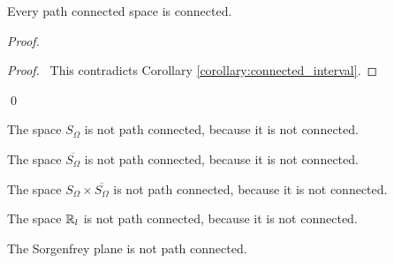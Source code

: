 \begin{proposition}
    \label{proposition:connected_path_connected}
    Every path connected space is connected.
\end{proposition}

\begin{proof}
    \pf
    \qedstep
    \begin{proof}
        \pf\ This contradicts Corollary \ref{corollary:connected_interval}.
    \end{proof}
    \qed
\end{proof}

\begin{example}
    The space $S_\Omega$ is not path connected, because it is not connected.
\end{example}

\begin{example}
    The space $\overline{S_\Omega}$ is not path connected, because it is not connected.
\end{example}

\begin{example}
    The space $S_\Omega \times \overline{S_\Omega}$ is not path connected, because it is not connected.
\end{example}

\begin{example}
    The space $\mathbb{R}_l$ is not path connected, because it is not connected.
\end{example}

\begin{corollary}
    The Sorgenfrey plane is not path connected.
\end{corollary}

